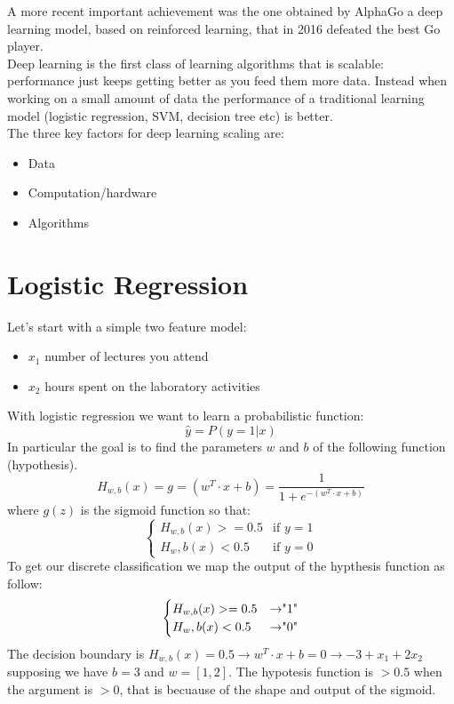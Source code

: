 \documentclass{article}
\begin{document}
A more recent important achievement was the one obtained by AlphaGo a deep learning model, based on reinforced learning, that in 2016 defeated the best Go player.\\
Deep learning is the first class of learning algorithms that is scalable: performance just keeps getting better as you feed them more data. Instead when working on a small amount of data the performance of a traditional learning model (logistic regression, SVM, decision tree etc) is better.\\
The three key factors for deep learning scaling are:
\begin{itemize}
    \item Data
    \item Computation/hardware
    \item Algorithms
\end{itemize}

\section{Logistic Regression}
Let's start with a simple two feature model:
\begin{itemize}
    \item $x_1$ number of lectures you attend
    \item $x_2$ hours spent on the laboratory activities
\end{itemize}
With logistic regression we want to learn a probabilistic function:
$$\hat{y} = P(y=1|x)$$
In particular the goal is to find the parameters $w$ and $b$ of the following function (hypothesis).
$$H_{w,b}(x)= g =(w^T\cdot x+b) = \frac{1}{1+e^{-(w^T\cdot x+b)}}$$
where $g(z)$ is the sigmoid function so that:
$$\begin{cases}
    H_{w,b}(x) >= 0.5 & \text{if } y=1\\
    H_w,b(x)<0.5 & \text{if } y=0
\end{cases}$$
To get our discrete classification we map the output of the hypthesis function as follow:
$$\begin{cases}
    H_{w,b}(x) >= 0.5 & \text{\textrightarrow "1"}\\
    H_w,b(x)<0.5 & \text{\textrightarrow "0"}
\end{cases}$$
The decision boundary is $H_{w,b}(x) = 0.5 \rightarrow w^T\cdot x+b=0\rightarrow-3+x_1+2x_2$ supposing we have $b=3$ and $w=[1,2]$. The hypotesis function is $>0.5$ when the argument is $>0$, that is becuause of the shape and output of the sigmoid.
\end{document}
